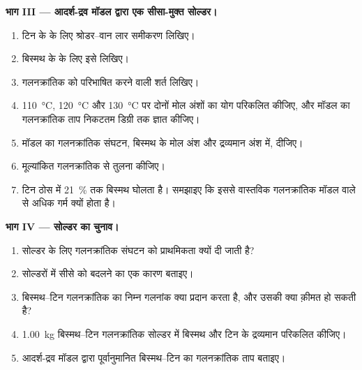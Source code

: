 \begin{problem}
\medskip
\noindent\textbf{भाग III --- आदर्श-द्रव मॉडल द्वारा एक सीसा-मुक्त सोल्डर।}
\begin{enumerate}[resume]
  \item टिन के  के लिए श्रोडर--वान लार समीकरण लिखिए।
  \item बिस्मथ के  के लिए इसे लिखिए।
  \item गलनक्रांतिक को परिभाषित करने वाली शर्त लिखिए।
  \item \qty{110}{\degreeCelsius},
        \qty{120}{\degreeCelsius} और \qty{130}{\degreeCelsius} पर दोनों मोल अंशों का योग परिकलित कीजिए, और
        मॉडल का गलनक्रांतिक ताप निकटतम डिग्री तक ज्ञात कीजिए।
  \item मॉडल का गलनक्रांतिक संघटन, बिस्मथ के मोल अंश और द्रव्यमान
        अंश में, दीजिए।
  \item मूल्यांकित गलनक्रांतिक से तुलना कीजिए।
  \item टिन ठोस में 21~\% तक बिस्मथ घोलता है। समझाइए कि इससे
        वास्तविक गलनक्रांतिक मॉडल वाले से अधिक गर्म क्यों होता है।
\end{enumerate}

\medskip
\noindent\textbf{भाग IV --- सोल्डर का चुनाव।}
\begin{enumerate}[resume]
  \item सोल्डर के लिए गलनक्रांतिक संघटन को प्राथमिकता क्यों दी जाती है?
  \item सोल्डरों में सीसे को बदलने का एक कारण बताइए।
  \item बिस्मथ--टिन गलनक्रांतिक का निम्न गलनांक क्या प्रदान करता है, और
        उसकी क्या क़ीमत हो सकती है?
  \item \qty{1.00}{kg} बिस्मथ--टिन गलनक्रांतिक सोल्डर में बिस्मथ और टिन के
        द्रव्यमान परिकलित कीजिए।
  \item आदर्श-द्रव मॉडल द्वारा पूर्वानुमानित बिस्मथ--टिन का गलनक्रांतिक ताप
        बताइए।
\end{enumerate}
\end{problem}
